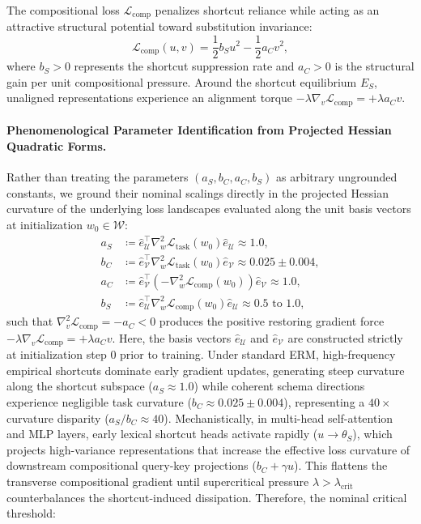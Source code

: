 \documentclass{article}
\theoremstyle{plain}
\theoremstyle{definition}
\begin{document}
The compositional loss $\mathcal{L}_{\text{comp}}$ penalizes shortcut reliance while acting as an attractive structural potential toward substitution invariance:
\begin{equation}
    \mathcal{L}_{\text{comp}}(u, v) = \frac{1}{2} b_S u^2 - \frac{1}{2} a_C v^2,
    \label{eq:comp_loss}
\end{equation}
where $b_S > 0$ represents the shortcut suppression rate and $a_C > 0$ is the structural gain per unit compositional pressure. Around the shortcut equilibrium $E_S$, unaligned representations experience an alignment torque $-\lambda \nabla_v \mathcal{L}_{\text{comp}} = +\lambda a_C v$.

\paragraph{Phenomenological Parameter Identification from Projected Hessian Quadratic Forms.}
Rather than treating the parameters $(a_S, b_C, a_C, b_S)$ as arbitrary ungrounded constants, we ground their nominal scalings directly in the projected Hessian curvature of the underlying loss landscapes evaluated along the unit basis vectors at initialization $w_0 \in \mathcal{W}$:
\begin{align}
    a_S &\coloneqq \hat{e}_{\mathcal{U}}^\top \nabla_w^2 \mathcal{L}_{\text{task}}(w_0) \hat{e}_{\mathcal{U}} \approx 1.0, \label{eq:a_S_def} \\
    b_C &\coloneqq \hat{e}_{\mathcal{V}}^\top \nabla_w^2 \mathcal{L}_{\text{task}}(w_0) \hat{e}_{\mathcal{V}} \approx 0.025 \pm 0.004, \label{eq:b_C_def} \\
    a_C &\coloneqq \hat{e}_{\mathcal{V}}^\top \left(-\nabla_w^2 \mathcal{L}_{\text{comp}}(w_0)\right) \hat{e}_{\mathcal{V}} \approx 1.0, \label{eq:a_C_def} \\
    b_S &\coloneqq \hat{e}_{\mathcal{U}}^\top \nabla_w^2 \mathcal{L}_{\text{comp}}(w_0) \hat{e}_{\mathcal{U}} \approx 0.5 \text{ to } 1.0, \label{eq:b_S_def}
\end{align}
such that $\nabla_v^2 \mathcal{L}_{\text{comp}} = -a_C < 0$ produces the positive restoring gradient force $-\lambda \nabla_v \mathcal{L}_{\text{comp}} = +\lambda a_C v$. Here, the basis vectors $\hat{e}_{\mathcal{U}}$ and $\hat{e}_{\mathcal{V}}$ are constructed strictly at initialization step 0 prior to training. Under standard ERM, high-frequency empirical shortcuts dominate early gradient updates, generating steep curvature along the shortcut subspace ($a_S \approx 1.0$) while coherent schema directions experience negligible task curvature ($b_C \approx 0.025 \pm 0.004$), representing a $40\times$ curvature disparity ($a_S / b_C \approx 40$). Mechanistically, in multi-head self-attention and MLP layers, early lexical shortcut heads activate rapidly ($u \to \theta_S$), which projects high-variance representations that increase the effective loss curvature of downstream compositional query-key projections ($b_C + \gamma u$). This flattens the transverse compositional gradient until supercritical pressure $\lambda > \lambda_{\text{crit}}$ counterbalances the shortcut-induced dissipation. Therefore, the nominal critical threshold:
\end{document}
